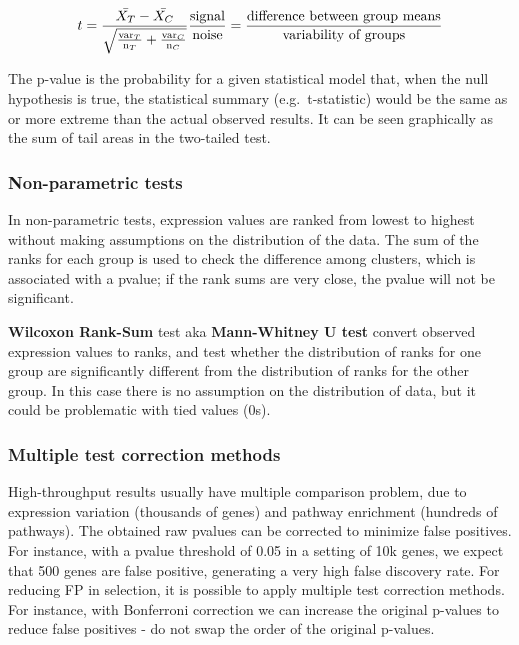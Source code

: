 \[
t=\frac{\bar{X_T}-\bar{X_C}}{\sqrt{\frac{\text{var}_T}{\text{n}_T}+\frac{\text{var}_C}{\text{n}_C}}} \\ \frac{\text{signal}}{\text{noise}} = \frac{\text{difference between group means}}{\text{variability  of groups}}
\]

The p-value is the probability for a given statistical model that, when
the null hypothesis is true, the statistical summary (e.g.~t-statistic)
would be the same as or more extreme than the actual observed results.
It can be seen graphically as the sum of tail areas in the two-tailed
test.

\hypertarget{non-parametric-tests}{%
\subsubsection{Non-parametric
tests}\label{non-parametric-tests}}

In non-parametric tests, expression values are ranked from lowest to
highest without making assumptions on the distribution of the data. The
sum of the ranks for each group is used to check the difference among
clusters, which is associated with a pvalue; if the rank sums are very
close, the pvalue will not be significant.

\textbf{Wilcoxon Rank-Sum} test aka \textbf{Mann-Whitney U test} convert
observed expression values to ranks, and test whether the distribution
of ranks for one group are significantly different from the distribution
of ranks for the other group. In this case there is no assumption on the
distribution of data, but it could be problematic with tied values (0s).

\hypertarget{multiple-test-correction-methods}{%
\subsubsection{Multiple test correction
methods}\label{multiple-test-correction-methods}}

High-throughput results usually have multiple comparison problem, due to
expression variation (thousands of genes) and pathway enrichment
(hundreds of pathways). The obtained raw pvalues can be corrected to
minimize false positives. For instance, with a pvalue threshold of 0.05
in a setting of 10k genes, we expect that 500 genes are false positive,
generating a very high false discovery rate. For reducing FP in
selection, it is possible to apply multiple test correction methods. For
instance, with Bonferroni correction we can increase the original
p-values to reduce false positives - do not swap the order of the
original p-values.

